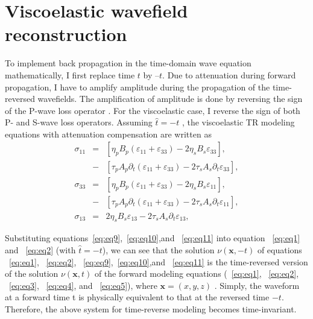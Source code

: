 

\section{Viscoelastic wavefield reconstruction}
To implement back propagation in the time-domain wave equation mathematically, I first replace time $t$ by $–t$. Due to attenuation during forward propagation, I have to amplify amplitude during the propagation of the time-reversed wavefields. The amplification of amplitude is done by reversing the sign of the P-wave loss operator \cite[]{zhu14b}. For the viscoelastic case, I reverse the sign of both P- and S-wave loss operators. Assuming $\hat{t}=-t$ , the viscoelastic TR modeling equations with attenuation compensation are written as
\begin{eqnarray}                   
\sigma _{11} &=&\left [ \eta _pB_p(\varepsilon_{11}+\varepsilon_{33} )-2\eta _sB_s\varepsilon_{33}  \right ] ,\nonumber \\
&-&\left [ \tau _pA_p\partial _t (\varepsilon_{11}+\varepsilon_{33} )-2\tau _sA_s\partial _t \varepsilon_{33} \right ],\label{eq:eq9}\\        
\sigma _{33} &=&\left [ \eta _pB_p(\varepsilon_{11}+\varepsilon_{33} )-2\eta _sB_s\varepsilon_{11}  \right ] ,\nonumber \\
&-&\left [ \tau _pA_p\partial _t (\varepsilon_{11}+\varepsilon_{33} )-2\tau _sA_s\partial _t \varepsilon_{11} \right ],\label{eq:eq10}\\
\sigma _{13} &=&2\eta _sB_s\varepsilon_{13} - 2\tau _sA_s\partial _t \varepsilon_{13},\label{eq:eq11}
\end{eqnarray}

Substituting equations~\ref{eq:eq9},~\ref{eq:eq10},and ~\ref{eq:eq11} into equation ~\ref{eq:eq1} and ~\ref{eq:eq2} (with $\hat{t}=-t $), we can see that the solution  $\nu(\mathbf{x},-t)$ of equations  ~\ref{eq:eq1}, ~\ref{eq:eq2}, ~\ref{eq:eq9},~\ref{eq:eq10},and ~\ref{eq:eq11} is the time-reversed version of the solution $\nu(\mathbf{x},t)$  of the forward modeling equations (~\ref{eq:eq1}, ~\ref{eq:eq2}, ~\ref{eq:eq3}, ~\ref{eq:eq4}, and ~\ref{eq:eq5}), where $\mathbf{x}=(x,y,z)$ . Simply, the waveform at a forward time t is physically equivalent to that at the reversed time $-t$. Therefore, the above system for time-reverse modeling becomes time-invariant.

